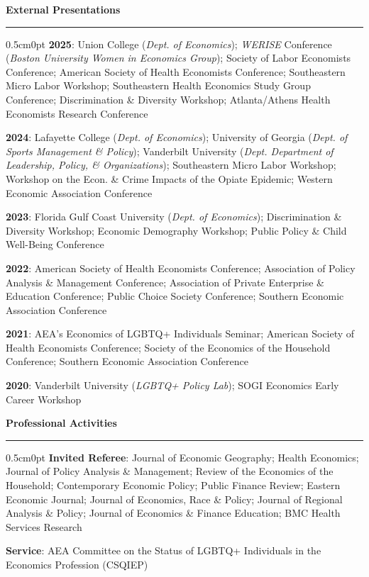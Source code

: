 \documentclass[
  11pt,
]{article}
\newcommand{\cvsection}[1]{
  {\Large \textbf{#1}}
  \vspace{0.2cm}
  \hrule
  \vspace{-0.2cm}
}
\begin{document}
\cvsection{External Presentations}

\vspace{0.2cm}
\begin{adjustwidth}{0.5cm}{0pt}
  \textbf{2025}: Union College (\textit{Dept. of Economics}); \textit{WERISE} Conference (\textit{Boston University Women in Economics Group}); Society of Labor Economists Conference; American Society of Health Economists Conference; Southeastern Micro Labor Workshop; Southeastern Health Economics Study Group Conference; Discrimination \& Diversity Workshop; Atlanta/Athens Health Economists Research Conference

  \textbf{2024}: Lafayette College (\textit{Dept. of Economics}); University of Georgia (\textit{Dept. of Sports Management \& Policy}); Vanderbilt University (\textit{Dept. Department of Leadership, Policy, \& Organizations}); Southeastern Micro Labor Workshop; Workshop on the Econ. \& Crime Impacts of the Opiate Epidemic; Western Economic Association Conference

  \textbf{2023}: Florida Gulf Coast University (\textit{Dept. of Economics}); Discrimination \& Diversity Workshop; Economic Demography Workshop; Public Policy \& Child Well-Being Conference

  \textbf{2022}: American Society of Health Economists Conference; Association of Policy Analysis \& Management Conference; Association of Private Enterprise \& Education Conference; Public Choice Society Conference; Southern Economic Association Conference

  \textbf{2021}: AEA’s Economics of LGBTQ+ Individuals Seminar; American Society of Health Economists Conference; Society of the Economics of the Household Conference; Southern Economic Association Conference

  \textbf{2020}: Vanderbilt University (\textit{LGBTQ+ Policy Lab}); SOGI Economics Early Career Workshop
\end{adjustwidth}

\cvsection{Professional Activities}

\vspace{0.2cm}
\begin{adjustwidth}{0.5cm}{0pt}
  \textbf{Invited Referee}: Journal of Economic Geography; Health Economics; Journal of Policy Analysis \& Management; Review of the Economics of the Household; Contemporary Economic Policy; Public Finance Review; Eastern Economic Journal; Journal of Economics, Race \& Policy; Journal of Regional Analysis \& Policy; Journal of Economics \& Finance Education; BMC Health Services Research
  
  \textbf{Service}: AEA Committee on the Status of LGBTQ+ Individuals in the Economics Profession (CSQIEP)
\end{adjustwidth}
\end{document}
